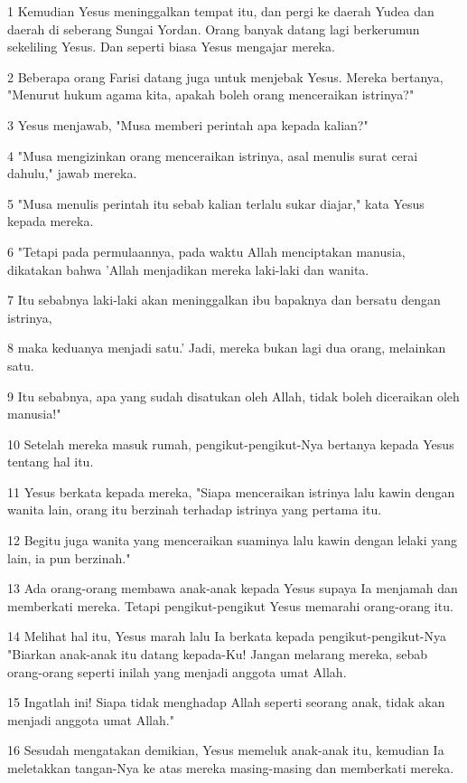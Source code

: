\par 1 Kemudian Yesus meninggalkan tempat itu, dan pergi ke daerah Yudea dan daerah di seberang Sungai Yordan. Orang banyak datang lagi berkerumun sekeliling Yesus. Dan seperti biasa Yesus mengajar mereka.
\par 2 Beberapa orang Farisi datang juga untuk menjebak Yesus. Mereka bertanya, "Menurut hukum agama kita, apakah boleh orang menceraikan istrinya?"
\par 3 Yesus menjawab, "Musa memberi perintah apa kepada kalian?"
\par 4 "Musa mengizinkan orang menceraikan istrinya, asal menulis surat cerai dahulu," jawab mereka.
\par 5 "Musa menulis perintah itu sebab kalian terlalu sukar diajar," kata Yesus kepada mereka.
\par 6 "Tetapi pada permulaannya, pada waktu Allah menciptakan manusia, dikatakan bahwa 'Allah menjadikan mereka laki-laki dan wanita.
\par 7 Itu sebabnya laki-laki akan meninggalkan ibu bapaknya dan bersatu dengan istrinya,
\par 8 maka keduanya menjadi satu.' Jadi, mereka bukan lagi dua orang, melainkan satu.
\par 9 Itu sebabnya, apa yang sudah disatukan oleh Allah, tidak boleh diceraikan oleh manusia!"
\par 10 Setelah mereka masuk rumah, pengikut-pengikut-Nya bertanya kepada Yesus tentang hal itu.
\par 11 Yesus berkata kepada mereka, "Siapa menceraikan istrinya lalu kawin dengan wanita lain, orang itu berzinah terhadap istrinya yang pertama itu.
\par 12 Begitu juga wanita yang menceraikan suaminya lalu kawin dengan lelaki yang lain, ia pun berzinah."
\par 13 Ada orang-orang membawa anak-anak kepada Yesus supaya Ia menjamah dan memberkati mereka. Tetapi pengikut-pengikut Yesus memarahi orang-orang itu.
\par 14 Melihat hal itu, Yesus marah lalu Ia berkata kepada pengikut-pengikut-Nya "Biarkan anak-anak itu datang kepada-Ku! Jangan melarang mereka, sebab orang-orang seperti inilah yang menjadi anggota umat Allah.
\par 15 Ingatlah ini! Siapa tidak menghadap Allah seperti seorang anak, tidak akan menjadi anggota umat Allah."
\par 16 Sesudah mengatakan demikian, Yesus memeluk anak-anak itu, kemudian Ia meletakkan tangan-Nya ke atas mereka masing-masing dan memberkati mereka.
